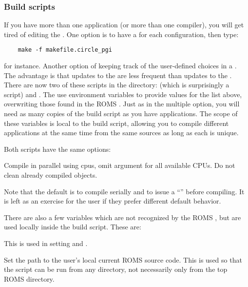 \subsubsection{Build scripts}

If you have more than one application (or more than one compiler),
you will get tired of editing the .
One option is to have a  for each configuration, then
type:
\begin{verbatim}
    make -f makefile.circle_pgi
\end{verbatim}
for instance. Another option of keeping track of the user-defined
choices in a . The advantage is that updates
to the  are less frequent than updates to the
. There are now two of these scripts in the 
directory:  (which is surprisingly a  script)
and .  The  use environment variables
to provide values for the list above, overwriting those found in the ROMS
. Just as in the multiple  option, you will
need as many copies of the build script as you have applications. The
scope of these variables is local to the build script, allowing you to
compile different applications at the same time from the same sources
as long as each  is unique.

Both scripts have the same options:
\begin{klist}
   Compile in parallel using  cpus,
  omit argument for all available CPUs.
      Do not clean already compiled objects.
\end{klist}
Note that the default is to compile serially and to issue a
``'' before compiling. It is left as an exercise
for the user if they prefer different default behavior.

There are also a few variables which are not recognized by the ROMS
, but are used locally inside the build script. These
are:
\begin{klist}
 This is used in setting
 and .

 Set the path to the user's local current ROMS source
code. This is used so that the script can be run from any directory,
not necessarily only from the top ROMS directory.
\end{klist}
